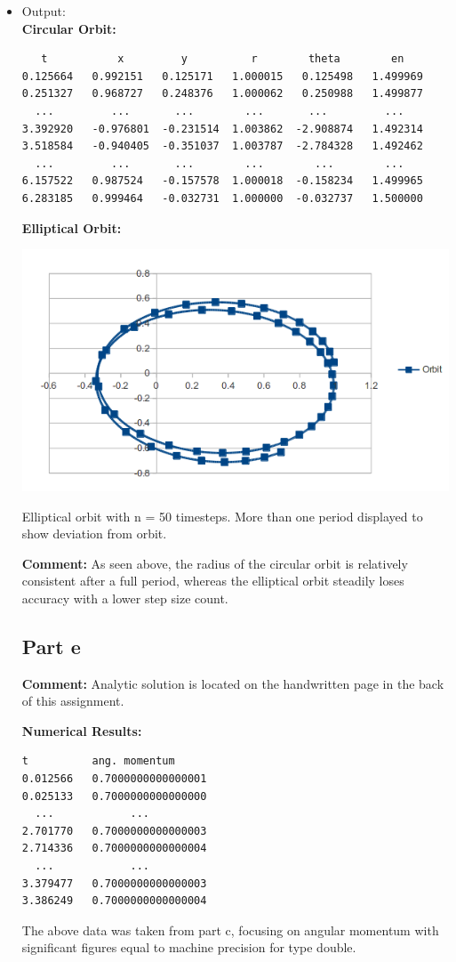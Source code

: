 \documentclass[10pt]{article}
\begin{document}
\begin{itemize}
\item Output: \\
\textbf{Circular Orbit:}
\begin{verbatim}
   t           x         y          r        theta        en
0.125664   0.992151   0.125171   1.000015   0.125498   1.499969
0.251327   0.968727   0.248376   1.000062   0.250988   1.499877
  ...         ...       ...        ...       ...         ...
3.392920   -0.976801  -0.231514  1.003862  -2.908874   1.492314
3.518584   -0.940405  -0.351037  1.003787  -2.784328   1.492462
  ...         ...       ...        ...        ...        ...
6.157522   0.987524   -0.157578  1.000018  -0.158234   1.499965
6.283185   0.999464   -0.032731  1.000000  -0.032737   1.500000
\end{verbatim}
\textbf{Elliptical Orbit:}
\begin{center}
\includegraphics[scale=.5]{EllipticalOrbit1}

\footnotesize Elliptical orbit with n = 50 timesteps. More than one period displayed to show deviation from orbit.
\end{center}
\textbf{Comment:} As seen above, the radius of the circular orbit is relatively consistent after a full period, whereas the elliptical orbit steadily loses accuracy with a lower step size count.

\subsection*{Part e}
\textbf{Comment:} Analytic solution is located on the handwritten page in the back of this assignment.

\textbf{Numerical Results:}
\begin{verbatim}
t          ang. momentum 
0.012566   0.7000000000000001
0.025133   0.7000000000000000
  ...            ...
2.701770   0.7000000000000003
2.714336   0.7000000000000004
  ...            ...
3.379477   0.7000000000000003
3.386249   0.7000000000000004
\end{verbatim}
The above data was taken from part c, focusing on angular momentum with significant figures equal to machine precision for type double.


\end{itemize}
\end{document}
